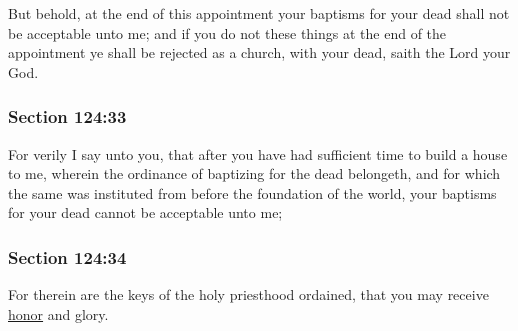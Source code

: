 		But behold, at the end of this appointment your baptisms for your dead shall not be acceptable unto me; and if you do not these things at the end of the appointment ye shall be rejected as a church, with your dead, saith the Lord your God.


	\subsubsection{Section 124:33} %
		\label{DC124-33}

		For verily I say unto you, that after you have had sufficient time to build a house to me, wherein the ordinance of baptizing for the dead belongeth, and for which the same was instituted from before the foundation of the world, your baptisms for your dead cannot be acceptable unto me;


	\subsubsection{Section 124:34} %
		\label{DC124-34}

		For therein are the keys of the holy priesthood ordained, that you may receive \hyperref[HONOR]{honor} and glory.


